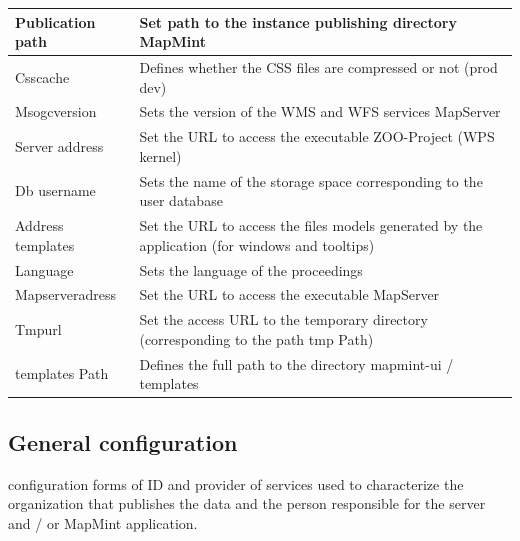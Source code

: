 \documentclass[letterpaper,10pt,english]{sphinxmanual}
\begin{document}
\begin{tabulary}{\linewidth}{|L|L|}
\\
\hline
Publication path
 & 
Set path to the instance publishing directory MapMint
\\
\hline
Csscache
 & 
Defines whether the CSS files are compressed or not (prod \textbar{} dev)
\\
\hline
Msogcversion
 & 
Sets the version of the WMS and WFS services MapServer
\\
\hline
Server address
 & 
Set the URL to access the executable ZOO-Project (WPS kernel)
\\
\hline
Db username
 & 
Sets the name of the storage space corresponding to the user database
\\
\hline
Address templates
 & 
Set the URL to access the files models generated by the application (for windows and tooltips)
\\
\hline
Language
 & 
Sets the language of the proceedings
\\
\hline
Mapserveradress
 & 
Set the URL to access the executable MapServer
\\
\hline
Tmpurl
 & 
Set the access URL to the temporary directory (corresponding to the path tmp Path)
\\
\hline
templates Path
 & 
Defines the full path to the directory mapmint-ui / templates
\\
\hline\end{tabulary}



\subsection{General configuration}
\label{dashboard/configuration:configuration-de-l-identification}
configuration forms of ID and provider of services used to characterize the organization that publishes the data and the person responsible for the server and / or MapMint application.
\end{document}
